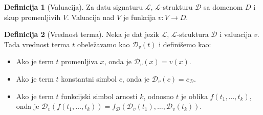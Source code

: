 \documentclass[a4paper,10pt]{article}
\theoremstyle{definition}
\newtheorem{definition}{Definicija}[section]
\begin{document}
\begin{definition}[Valuacija]
    Za datu signaturu $\mathcal{L}$, $\mathcal{L}$-strukturu $\mathcal{D}$ sa domenom $D$ i skup promenljivih $V$. Valuacija nad $V$ je funkcija $v : V \to D$.
\end{definition}

\begin{definition}[Vrednost terma]
    Neka je dat jezik $\mathcal{L}$, $\mathcal{L}$-struktura $\mathcal{D}$ i valuacija $v$. Tada vrednost terma $t$ obeležavamo kao $\mathcal{D}_v (t)$ i definišemo kao:
    \begin{itemize}
        \item{Ako je term $t$ promenljiva $x$, onda je $\mathcal{D}_v(x) = v(x)$.}
        \item{Ako je term $t$ konstantni simbol $c$, onda je $\mathcal{D}_v(c) = c_\mathcal{D}$.}
        \item{Ako je term $t$ funkcijski simbol arnosti $k$, odnosno $t$ je oblika $f(t_1, \ldots, t_k)$, onda je $\mathcal{D}_v(f(t_1, \ldots, t_k)) = f_\mathcal{D}(\mathcal{D}_v(t_1), \ldots, \mathcal{D}_v(t_k))$.}
    \end{itemize}
\end{definition}
\end{document}
